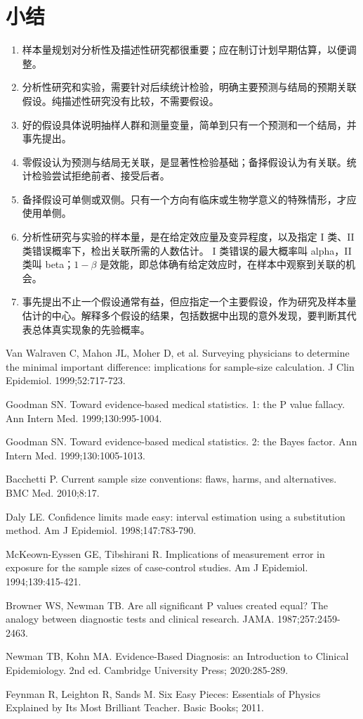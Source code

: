 \section{小结}
\begin{enumerate}
\item 样本量规划对分析性及描述性研究都很重要；应在制订计划早期估算，以便调整。
\item 分析性研究和实验，需要针对后续统计检验，明确主要预测与结局的预期关联假设。纯描述性研究没有比较，不需要假设。
\item 好的假设具体说明抽样人群和测量变量，简单到只有一个预测和一个结局，并事先提出。
\item 零假设认为预测与结局无关联，是显著性检验基础；备择假设认为有关联。统计检验尝试拒绝前者、接受后者。
\item 备择假设可单侧或双侧。只有一个方向有临床或生物学意义的特殊情形，才应使用单侧。
\item 分析性研究与实验的样本量，是在给定效应量及变异程度，以及指定 I 类、II 类错误概率下，检出关联所需的人数估计。
I 类错误的最大概率叫 alpha，II 类叫 beta；$1-\beta$ 是效能，即总体确有给定效应时，在样本中观察到关联的机会。
\item 事先提出不止一个假设通常有益，但应指定一个主要假设，作为研究及样本量估计的中心。解释多个假设的结果，包括数据中出现的意外发现，要判断其代表总体真实现象的先验概率。
\end{enumerate}
\begin{references}
\item Van Walraven C, Mahon JL, Moher D, et al. Surveying physicians to determine the minimal important difference: implications for sample-size calculation. J Clin Epidemiol. 1999;52:717-723.
\item Goodman SN. Toward evidence-based medical statistics. 1: the P value fallacy. Ann Intern Med. 1999;130:995-1004.
\item Goodman SN. Toward evidence-based medical statistics. 2: the Bayes factor. Ann Intern Med. 1999;130:1005-1013.
\item Bacchetti P. Current sample size conventions: flaws, harms, and alternatives. BMC Med. 2010;8:17.
\item Daly LE. Confidence limits made easy: interval estimation using a substitution method. Am J Epidemiol. 1998;147:783-790.
\item McKeown-Eyssen GE, Tibshirani R. Implications of measurement error in exposure for the sample sizes of case-control studies. Am J Epidemiol. 1994;139:415-421.
\item Browner WS, Newman TB. Are all significant P values created equal? The analogy between diagnostic tests and clinical research. JAMA. 1987;257:2459-2463.
\item Newman TB, Kohn MA. Evidence-Based Diagnosis: an Introduction to Clinical Epidemiology. 2nd ed. Cambridge University Press; 2020:285-289.
\item Feynman R, Leighton R, Sands M. Six Easy Pieces: Essentials of Physics Explained by Its Most Brilliant Teacher. Basic Books; 2011.
\end{references}
